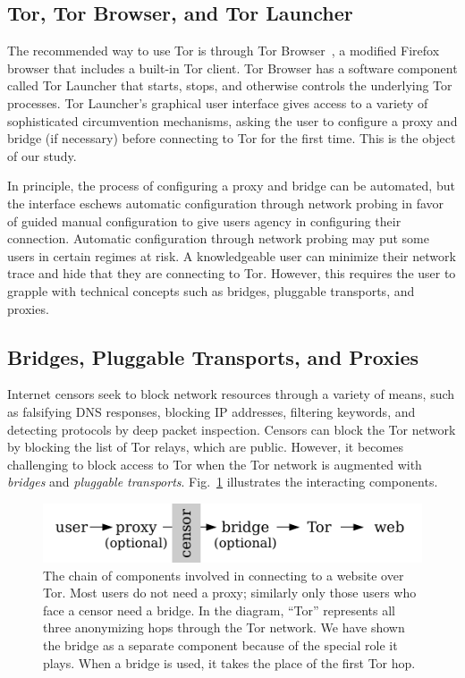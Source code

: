 \documentclass[USenglish,oneside,twocolumn]{article}
\begin{document}
\subsection{Tor, Tor Browser, and Tor Launcher}
The recommended way to use Tor is through Tor Browser~\cite{torbrowser},
a modified Firefox browser that includes a built-in Tor client.
Tor Browser has a software component called Tor Launcher that
starts, stops, and otherwise controls the underlying Tor processes.
Tor Launcher's graphical user interface gives access to a variety of 
sophisticated circumvention mechanisms, asking the user
to configure a proxy and bridge (if necessary) before connecting to Tor
for the first time. This is the object of our study. 

In principle, the process of configuring a proxy and bridge can be automated, but
the interface eschews automatic configuration through network probing
in favor of guided manual configuration to give users agency in configuring their connection. 
Automatic configuration through network probing may put some users in certain regimes at risk. 
A knowledgeable user can minimize their network trace and hide that they are connecting to Tor.
However, this requires the user to grapple with technical concepts such as 
bridges, pluggable transports, and proxies.

\subsection{Bridges, Pluggable Transports, and Proxies} 
Internet censors seek to block network resources through 
a variety of means, such as falsifying DNS responses, blocking IP addresses, 
filtering keywords, and detecting protocols by deep packet inspection.
Censors can block the Tor network by blocking the list of Tor relays, which 
are public. However, it becomes challenging to block access to Tor when
the Tor network is augmented with \emph{bridges} and \emph{pluggable transports}.
Fig.~\ref{fig:topology} illustrates the interacting components.

\begin{figure}
\centering
\includegraphics{topology.pdf}
\caption{
The chain of components involved in connecting to a website over Tor.
Most users do not need a proxy;
similarly only those users who face a censor need a bridge.
In the diagram, ``Tor'' represents all three anonymizing hops through the Tor network.
We have shown the bridge as a separate component
because of the special role it plays.
When a bridge is used, it takes the place of the first Tor hop.
}
\label{fig:topology}
\end{figure}
\end{document}
